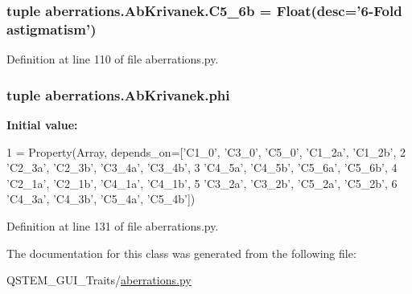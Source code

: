 \hypertarget{classaberrations_1_1_ab_krivanek_a4f142f6028261cce8c2676a4e035a773}{
\subsubsection[{C5\-\_\-6b}]{\setlength{\rightskip}{0pt plus 5cm}tuple aberrations.\-Ab\-Krivanek.\-C5\-\_\-6b = Float(desc='6-\/Fold astigmatism')\hspace{0.3cm}{\ttfamily [static]}}}\label{classaberrations_1_1_ab_krivanek_a4f142f6028261cce8c2676a4e035a773}


Definition at line 110 of file aberrations.\-py.

\hypertarget{classaberrations_1_1_ab_krivanek_a4fef2670dae44658f6ca6f9c3804d96c}{
\subsubsection[{phi}]{\setlength{\rightskip}{0pt plus 5cm}tuple aberrations.\-Ab\-Krivanek.\-phi\hspace{0.3cm}{\ttfamily [static]}}}\label{classaberrations_1_1_ab_krivanek_a4fef2670dae44658f6ca6f9c3804d96c}
{\bfseries Initial value\-:}
\begin{DoxyCode}
1 = Property(Array, depends\_on=[\textcolor{stringliteral}{'C1\_0'}, \textcolor{stringliteral}{'C3\_0'}, \textcolor{stringliteral}{'C5\_0'}, \textcolor{stringliteral}{'C1\_2a'}, \textcolor{stringliteral}{'C1\_2b'},
2                                       \textcolor{stringliteral}{'C2\_3a'}, \textcolor{stringliteral}{'C2\_3b'}, \textcolor{stringliteral}{'C3\_4a'}, \textcolor{stringliteral}{'C3\_4b'},
3                                       \textcolor{stringliteral}{'C4\_5a'}, \textcolor{stringliteral}{'C4\_5b'}, \textcolor{stringliteral}{'C5\_6a'}, \textcolor{stringliteral}{'C5\_6b'},
4                                       \textcolor{stringliteral}{'C2\_1a'}, \textcolor{stringliteral}{'C2\_1b'}, \textcolor{stringliteral}{'C4\_1a'}, \textcolor{stringliteral}{'C4\_1b'},
5                                       \textcolor{stringliteral}{'C3\_2a'}, \textcolor{stringliteral}{'C3\_2b'}, \textcolor{stringliteral}{'C5\_2a'}, \textcolor{stringliteral}{'C5\_2b'},
6                                       \textcolor{stringliteral}{'C4\_3a'}, \textcolor{stringliteral}{'C4\_3b'}, \textcolor{stringliteral}{'C5\_4a'}, \textcolor{stringliteral}{'C5\_4b'}])
\end{DoxyCode}


Definition at line 131 of file aberrations.\-py.



The documentation for this class was generated from the following file\-:\begin{DoxyCompactItemize}
\item 
Q\-S\-T\-E\-M\-\_\-\-G\-U\-I\-\_\-\-Traits/\hyperlink{aberrations_8py}{aberrations.\-py}\end{DoxyCompactItemize}
